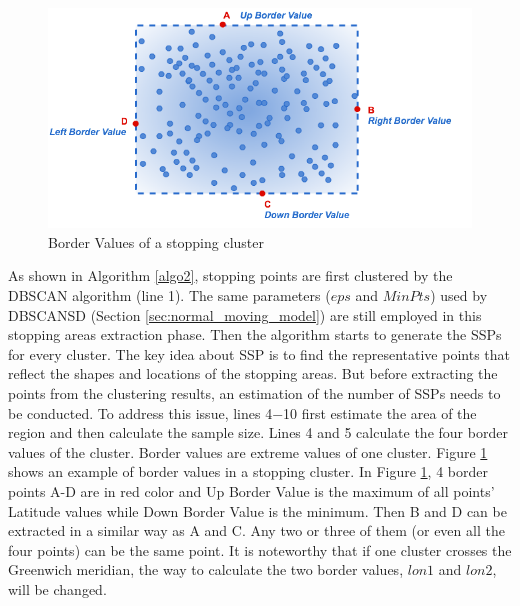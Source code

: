 \documentclass[12pt,glossary]{dalcsthesis}
\begin{document}
\begin{figure}[!htb]
\centering
\includegraphics[width=5.5in]{borderValue.png}
\caption{Border Values of a stopping cluster}
\label{fig:border_value}
\end{figure}


As shown in Algorithm \ref{algo2}, stopping points are first clustered by the DBSCAN \cite{DBScan96} algorithm (line 1). The same parameters ($eps$ and $MinPts$) used by DBSCANSD (Section \ref{sec:normal_moving_model}) are still employed in this stopping areas extraction phase. Then the algorithm starts to generate the SSPs for every cluster. The key idea about SSP is to find the representative points that reflect the shapes and locations of the stopping areas. But before extracting the points from the clustering results, an estimation of the number of SSPs needs to be conducted. To address this issue,  lines 4$-$10 first estimate the area of the region and then calculate the sample size. Lines 4 and 5 calculate the four border values of the cluster. Border values are extreme values of one cluster. Figure \ref{fig:border_value} shows an example of border values in a stopping cluster. In Figure \ref{fig:border_value}, 4 border points A-D are in red color and Up Border Value is the maximum of all points' Latitude values while Down Border Value is the minimum. Then B and D can be extracted in a similar way as A and C. Any two or three of them (or even all the four points) can be the same point. It is noteworthy that if one cluster crosses the Greenwich meridian, the way to calculate the two border values, $lon1$ and $lon2$, will be changed. 
\end{document}
